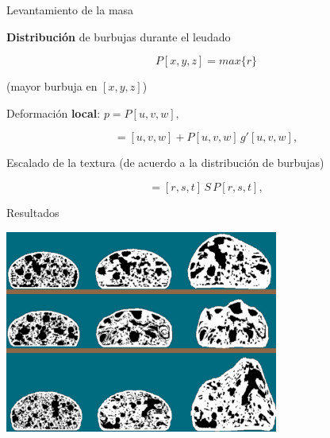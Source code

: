 \documentclass[spanish,unknownkeysallowed,10pt]{beamer}
\begin{document}
\begin{frame}{Levantamiento de la masa}

\textbf{Distribución} de burbujas durante el leudado

\begin{equation*}
P[x,y,z] = max \bigg\{r\bigg\}
\end{equation*}

(mayor burbuja en $[x,y,z]$)

\vspace{0.2cm}

Deformación \textbf{local}: $p = P[u,v,w],$

\begin{equation*}
[r,s,t] = [u,v,w] + P[u,v,w] \, g'[u,v,w],
\end{equation*}


Escalado de la textura (de acuerdo a la distribución de burbujas)


\begin{equation*}
[x,y,z] = [r,s,t]\, S \, P[r,s,t],
\end{equation*}

\end{frame}

\begin{frame}{Resultados}

\centerline{\includegraphics[width=9cm]{../figures/Fig9}}

\end{frame}
\end{document}
